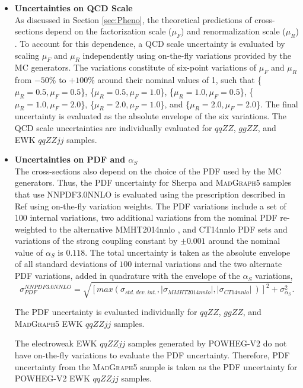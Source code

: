 \begin{itemize}
\item{\textbf{Uncertainties on QCD Scale}\\ As discussed in Section \ref{sec:Pheno}, the theoretical predictions of cross-sections depend on the factorization scale ($\mu_{F}$) and renormalization scale ($\mu_{R}$) \cite{QCDScaleAndPDFUnc}. To account for this dependence, a QCD scale uncertainty is evaluated by scaling $\mu_{F}$ and $\mu_{R}$ independently using on-the-fly variations provided by the MC generators. The variations constitute of six-point variations of $\mu_{F}$ and $\mu_{R}$ from $-50\%$ to $+100\%$ around their nominal values of 1, such that \{$\mu_R = 0.5, \mu_F = 0.5$\}, \{$\mu_R = 0.5, \mu_F = 1.0$\}, \{$\mu_R = 1.0, \mu_F = 0.5$\}, \{$\mu_R = 1.0, \mu_F = 2.0$\}, \{$\mu_R = 2.0, \mu_F = 1.0$\}, and \{$\mu_R = 2.0, \mu_F = 2.0$\}. The final uncertainty is evaluated as the absolute envelope of the six variations. The QCD scale uncertainties are individually evaluated for $qqZZ$, $ggZZ$, and EWK $qqZZjj$ samples.
}
\item{\textbf{Uncertainties on PDF and $\alpha_{S}$}\\ The cross-sections also depend on the choice of the PDF used by the MC generators. Thus, the PDF uncertainty for Sherpa and \textsc{MadGraph5} samples that use NNPDF3.0NNLO is evaluated using the prescription described in Ref \cite{PDFForRunII} using on-the-fly variation weights. The PDF variations include a set of 100 internal variations, two additional variations from the nominal PDF re-weighted to the alternative MMHT2014nnlo \cite{MMHT2014PDFs}, and CT14nnlo \cite{CT14nnlo} PDF sets and variations of the strong coupling constant by $\pm0.001$ around the nominal value of $\alpha_{S}$ is $0.118$. The total uncertainty is taken as the absolute envelope of all standard deviations of $100$ internal variations and the two alternate PDF variations, added in quadrature with the envelope of the $\alpha_{S}$ variations, 
\begin{equation}
    \sigma_{PDF}^{NNPDF3.0NNLO} = \sqrt{ [ max (\sigma_{std.~dev.~int.}, |\sigma_{MMHT2014nnlo}| , |\sigma_{CT14nnlo}|~)]^2 + \sigma_{\alpha_S}^2 }.
\end{equation}

The PDF uncertainty is evaluated individually for $qqZZ$, $ggZZ$, and \textsc{MadGraph5} EWK $qqZZjj$ samples.

The electroweak EWK $qqZZjj$ samples generated by \textsc{POWHEG-V2} do not have on-the-fly variations to evaluate the PDF uncertainty. Therefore, PDF uncertainty from the \textsc{MadGraph5} sample is taken as the PDF uncertainty for \textsc{POWHEG-V2} EWK $qqZZjj$ samples.
}


\end{itemize}
